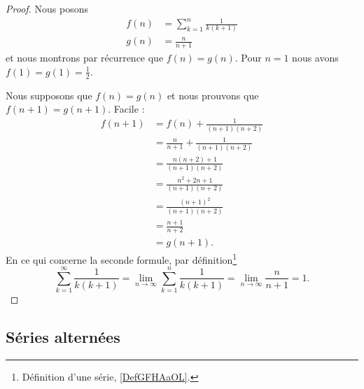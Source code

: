 \begin{proof}
    Nous posons
    \begin{subequations}
        \begin{align}
            f(n)&=\sum_{k=1}^n\frac{1}{ k(k+1) }\\
            g(n)&=\frac{ n }{ n+1 }
        \end{align}
    \end{subequations}
    et nous montrons par récurrence que \( f(n)=g(n)\). Pour \( n=1\) nous avons \( f(1)=g(1)=\frac{ 1 }{2}\).

    Nous supposons que \( f(n)=g(n)\) et nous prouvons que \( f(n+1)=g(n+1)\). Facile :
    \begin{subequations}
        \begin{align}
            f(n+1)&=f(n)+\frac{1}{ (n+1)(n+2) }\\
            &=\frac{ n }{ n+1 }+\frac{1}{ (n+1)(n+2) }\\
            &=\frac{ n(n+2)+1 }{ (n+1)(n+2) }\\
            &=\frac{ n^2+2n+1 }{ (n+1)(n+2) }\\
            &=\frac{ (n+1)^2 }{ (n+1)(n+2) }\\
            &=\frac{ n+1 }{ n+2 }\\
            &=g(n+1).
        \end{align}
    \end{subequations}
    En ce qui concerne la seconde formule, par définition\footnote{Définition d'une série, \ref{DefGFHAaOL}.}
    \begin{equation}
        \sum_{k=1}^{\infty}\frac{1}{ k(k+1) }=\lim_{n\to \infty} \sum_{k=1}^n\frac{1}{ k(k+1) }=\lim_{n\to \infty}\frac{ n }{ n+1 } =1.
    \end{equation}
\end{proof}

\subsection{Séries alternées}

